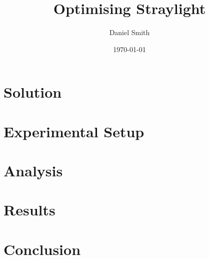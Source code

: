 \documentclass[a4paper]{article}
\title{Optimising Straylight}
\author{Daniel Smith}
\date{\today}
\begin{document}
\maketitle

\section{Solution}

\section{Experimental Setup}

\section{Analysis}

\section{Results}

\section{Conclusion}
\end{document}
